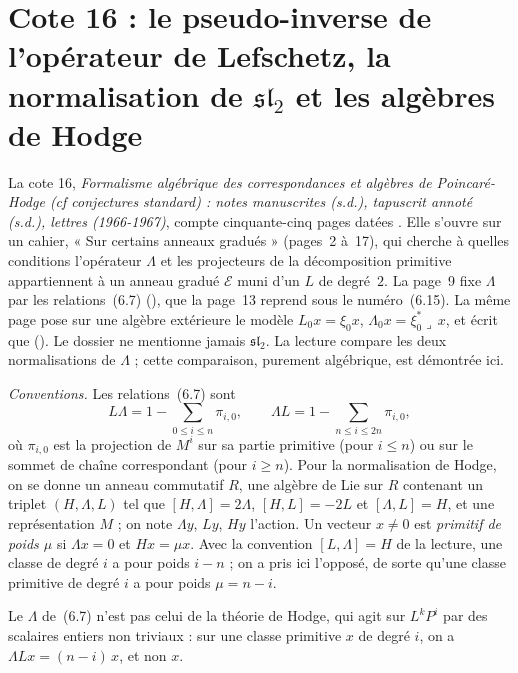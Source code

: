 \section[Cote 16 : le pseudo-inverse de l'opérateur de Lefschetz, la normalisation de sl(2) et les algèbres de Hodge]{Cote 16 : le pseudo-inverse de l'opérateur de Lefschetz, la normalisation de $\mathfrak{sl}_2$ et les algèbres de Hodge\protect{}}\label{sec:16}

La cote 16, \emph{Formalisme algébrique des correspondances et algèbres de Poincaré-Hodge (cf conjectures standard) : notes manuscrites (s.d.), tapuscrit annoté (s.d.), lettres (1966-1967)}, compte cinquante-cinq pages datées . Elle s'ouvre sur un cahier, « Sur certains anneaux gradués » (pages~2 à~17), qui cherche à quelles conditions l'opérateur $\Lambda$ et les projecteurs de la décomposition primitive appartiennent à un anneau gradué $\mathcal E$ muni d'un $L$ de degré~$2$. La page~9 fixe $\Lambda$ par les relations~(6.7) (), que la page~13 reprend sous le numéro~(6.15). La même page pose sur une algèbre extérieure le modèle $L_0 x = \xi_0 x$, $\Lambda_0 x = \xi_0^* \lrcorner\, x$, et écrit que  (). Le dossier ne mentionne jamais $\mathfrak{sl}_2$. La lecture compare les deux normalisations de $\Lambda$ ; cette comparaison, purement algébrique, est démontrée ici.

\noindent\emph{Conventions.} Les relations~(6.7) sont
\[
L\Lambda = 1 - \sum_{0 \leqslant i \leqslant n} \pi_{i,0}, \qquad \Lambda L = 1 - \sum_{n \leqslant i \leqslant 2n} \pi_{i,0},
\]
où $\pi_{i,0}$ est la projection de $M^i$ sur sa partie primitive (pour $i \leqslant n$) ou sur le sommet de chaîne correspondant (pour $i \geqslant n$). Pour la normalisation de Hodge, on se donne un anneau commutatif $R$, une algèbre de Lie sur $R$ contenant un triplet $(H, \Lambda, L)$ tel que $[H, \Lambda] = 2\Lambda$, $[H, L] = -2L$ et $[\Lambda, L] = H$, et une représentation $M$ ; on note $\Lambda y$, $Ly$, $Hy$ l'action. Un vecteur $x \neq 0$ est \emph{primitif de poids $\mu$} si $\Lambda x = 0$ et $Hx = \mu x$. Avec la convention $[L, \Lambda] = H$ de la lecture, une classe de degré $i$ a pour poids $i - n$ ; on a pris ici l'opposé, de sorte qu'une classe primitive de degré $i$ a pour poids $\mu = n - i$.

\begin{enonce}
Le $\Lambda$ de~(6.7) n'est pas celui de la théorie de Hodge, qui agit sur $L^k P^i$ par des scalaires entiers non triviaux : sur une classe primitive $x$ de degré $i$, on a $\Lambda L x = (n - i)\,x$, et non $x$.
\end{enonce}

